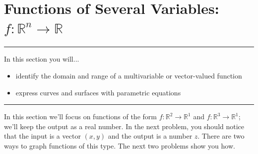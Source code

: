 \documentclass[10pt,]{book}
\theoremstyle{plain}
\theoremstyle{definition}
\theoremstyle{definition}
\theoremstyle{definition}
\theoremstyle{definition}
\newenvironment{objectives}[1]{\noindent\rule{\linewidth}{0.1ex}\newline{\textbf{{\large#1}}\par\smallskip}}{\par\noindent\rule{\linewidth}{0.1ex}\par\smallskip}
\theoremstyle{definition}
\numberwithin{equation}{section}
\begin{document}
\begin{exercisegroup}
\end{exercisegroup}
\par\smallskip\noindent
\typeout{************************************************}
\typeout{************************************************}
\section[{Functions of Several Variables: \(f\colon {\mathbb{R}}^n\to {\mathbb{R}}\)}]{Functions of Several Variables: \(f\colon {\mathbb{R}}^n\to {\mathbb{R}}\)}\label{ch06_04_severalvars}
\begin{objectives}{Objectives}\label{objectives-12}
In this section you will...%
%
\begin{itemize}[label=\textbullet]
\item{}identify the domain and range of a multivariable or vector-valued function%
\item{}express curves and surfaces with parametric equations%
\end{itemize}
\end{objectives}
In this section we'll focus on functions of the form \(f\colon \mathbb{R}^2\to\mathbb{R}^1\) and \(f\colon \mathbb{R}^3\to\mathbb{R}^1\); we'll keep the output as a real number. In the next problem, you should notice that the input is a vector \((x,y)\) and the output is a number \(z\). There are two ways to graph functions of this type. The next two problems show you how.%
\typeout{************************************************}
\typeout{************************************************}
\end{document}
